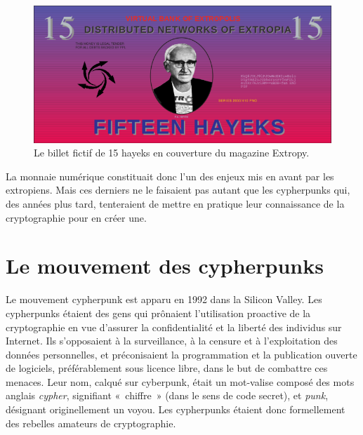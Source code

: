 \documentclass[
  a5paper,
  smalldemyvopaper,10pt,twoside,onecolumn,openright,extrafontsizes,hidelinks]{memoir}
\begin{document}
\begin{figure}[H]

{\centering \includegraphics{chapters/img/fifteen-hayeks-note-extropy-15.png}

}

\caption{Le billet fictif de 15 hayeks en couverture du magazine
Extropy.}

\end{figure}%

La monnaie numérique constituait donc l'un des enjeux mis en avant par
les extropiens. Mais ces derniers ne le faisaient pas autant que les
cypherpunks qui, des années plus tard, tenteraient de mettre en pratique
leur connaissance de la cryptographie pour en créer une.

\section*{Le mouvement des
cypherpunks}\label{le-mouvement-des-cypherpunks}


Le mouvement cypherpunk est apparu en 1992 dans la Silicon Valley. Les
cypherpunks étaient des gens qui prônaient l'utilisation proactive de la
cryptographie en vue d'assurer la confidentialité et la liberté des
individus sur Internet. Ils s'opposaient à la surveillance, à la censure
et à l'exploitation des données personnelles, et préconisaient la
programmation et la publication ouverte de logiciels, préférablement
sous licence libre, dans le but de combattre ces menaces. Leur nom,
calqué sur cyberpunk, était un mot-valise composé des mots anglais
\emph{cypher}, signifiant «~chiffre~» (dans le sens de code secret), et
\emph{punk}, désignant originellement un voyou. Les cypherpunks étaient
donc formellement des rebelles amateurs de cryptographie.
\end{document}
